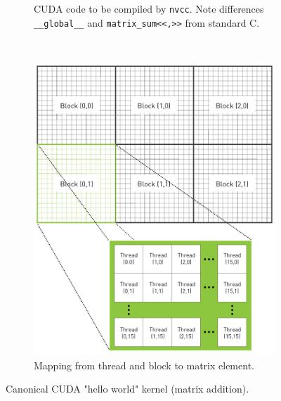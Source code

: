 \begin{figure}
    \centering
    \begin{subfigure}{\linewidth}
        \centering
        \inputminted{c}{code/hello_world_kernel.c}
        \caption{CUDA code to be compiled by \texttt{nvcc}.
        Note differences \texttt{__global__} and \texttt{matrix_sum<<,>>} from standard C.}
        \label{lst:cuda_hello_world}
    \end{subfigure}
    \\[3ex]
    \begin{subfigure}{\linewidth}
        \centering
        \includegraphics[width=\linewidth]{figures/matrix_thread.png}
        \caption{Mapping from thread and block to matrix element.}
        \label{fig:matrix_thread}
    \end{subfigure}
    \caption{Canonical CUDA "hello world" kernel (matrix addition).}
    \label{fig:cuda_hello_world}
\end{figure}

